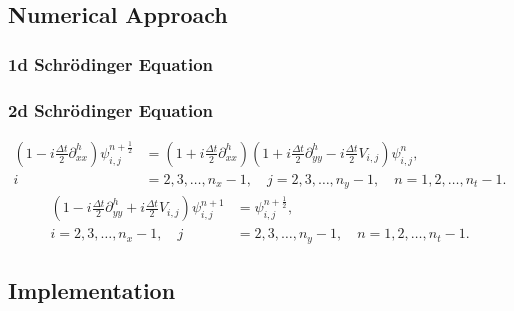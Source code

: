 \documentclass[10pt]{article}
\begin{document}



\subsection*{Numerical Approach}

\subsubsection*{1d Schrödinger Equation}




\subsubsection*{2d Schrödinger Equation}

\begin{align}\label{ADI_1}
\left( 1 - i \frac{\Delta t}{2} \partial_{xx}^h \right) \psi_{i,j}^{n+\frac{1}{2}} &=
\left( 1 + i \frac{\Delta t}{2} \partial_{xx}^h \right)
\left( 1 + i \frac{\Delta t}{2} \partial_{yy}^h - i \frac{\Delta t}{2} V_{i,j} \right) \psi_{i,j}^n,
\nonumber \\ i &= 2,3,\ldots,n_x-1, \quad j = 2,3,\ldots,n_y-1, \quad n = 1,2,\ldots,n_t-1.
\end{align}
\begin{align}\label{ADI_2}
\left( 1 - i \frac{\Delta t}{2} \partial_{yy}^h + i \frac{\Delta t}{2} V_{i,j} \right) 
\psi_{i,j}^{n+1} &= \psi_{i,j}^{n+\frac{1}{2}},
\nonumber \\ i = 2,3,\ldots,n_x-1, \quad j &= 2,3,\ldots,n_y-1, \quad n = 1,2,\ldots,n_t-1.
\end{align}




\subsection*{Implementation}
\end{document}
